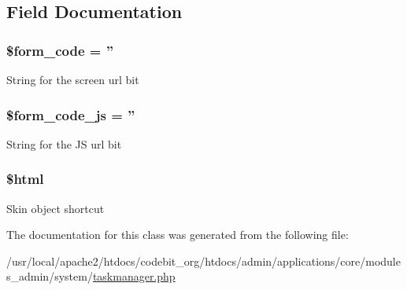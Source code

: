 \subsection{Field Documentation}
\hypertarget{classadmin__core__system__taskmanager_af28aee726fa3eb6c355d08a2ab655e03}{
\subsubsection[{\$form\-\_\-code}]{\setlength{\rightskip}{0pt plus 5cm}\$form\-\_\-code = ''}}\label{classadmin__core__system__taskmanager_af28aee726fa3eb6c355d08a2ab655e03}
String for the screen url bit \hypertarget{classadmin__core__system__taskmanager_ac68fe8a02a2efd63c3271179f4b4fbb7}{
\subsubsection[{\$form\-\_\-code\-\_\-js}]{\setlength{\rightskip}{0pt plus 5cm}\$form\-\_\-code\-\_\-js = ''}}\label{classadmin__core__system__taskmanager_ac68fe8a02a2efd63c3271179f4b4fbb7}
String for the J\-S url bit \hypertarget{classadmin__core__system__taskmanager_a6f96e7fc92441776c9d1cd3386663b40}{
\subsubsection[{\$html}]{\setlength{\rightskip}{0pt plus 5cm}\$html}}\label{classadmin__core__system__taskmanager_a6f96e7fc92441776c9d1cd3386663b40}
Skin object shortcut 

The documentation for this class was generated from the following file\-:\begin{DoxyCompactItemize}
\item 
/usr/local/apache2/htdocs/codebit\-\_\-org/htdocs/admin/applications/core/modules\-\_\-admin/system/\hyperlink{taskmanager_8php}{taskmanager.\-php}\end{DoxyCompactItemize}
